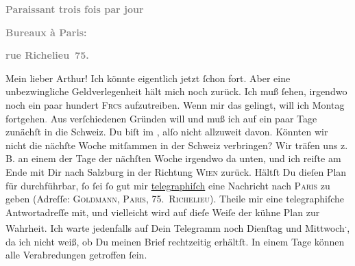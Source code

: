 \pstart
           \begin{otherlanguage}{french}\textcolor{gray}{\textbf{\textbf{Paraissant trois fois par jour}}}\end{otherlanguage}\pend
           
\pstart
           \begin{otherlanguage}{french}\textcolor{gray}{\textbf{\textbf{Bureaux à Paris:}}}\end{otherlanguage}\pend
           
\pstart
           \begin{otherlanguage}{french}\textcolor{gray}{\textbf{\textbf{rue Richelieu 75.}}}\end{otherlanguage}\pend
           
\pstart\center{}Mein lieber Arthur!\pend\vspace{0.5em}
\pstart
           Ich könnte eigentlich jetzt{ }ſchon fort. Aber eine unbezwingliche Geldverlegenheit
               hält mich noch zurück. Ich muß{ }ſehen, irgendwo noch ein paar hundert \textsc{Frcs} aufzutreiben. Wenn mir das gelingt, will ich Montag fortgehen\textcolor{gray}{.} Aus verſchiedenen
               Gründen will und muß ich auf ein paar Tage zunächſt in die Schweiz. Du biſt im \label{K_L02713-1v}\label{K_L02713-1}, alſo nicht allzuweit davon. Könnten wir nicht
               die nächſte Woche mitſammen {\pb}in der Schweiz verbringen? Wir träfen uns z. B. an einem der Tage
               der nächſten Woche irgendwo da unten, und ich reiſte am Ende mit Dir nach Salzburg in der Richtung \textsc{Wien} zurück. Hältſt Du dieſen Plan für durchführbar,{ }ſo{ }ſei{ }ſo gut mir \uline{telegraphiſch} eine Nachricht nach \textsc{Paris} zu geben (Adreſſe: \textsc{Goldmann}, \textsc{Paris, 75. Richelieu}). Theile mir eine telegraphiſche Antwortadreſſe mit, und vielleicht wird auf
               dieſe Weiſe der kühne Plan zur Wahrheit. Ich warte jedenfalls auf Dein\strikeout{\textcolor{gray}{e}} Telegramm noch Dienſtag und Mittwoch\substVorne{}\textsuperscript{.}\substDazwischen{},\substHinten{} da ich nicht {\pb}weiß, ob Du meinen Brief
               rechtzeitig erhältſt. In einem Tage können alle Verabredungen getroffen{ }ſein.\pend
           
